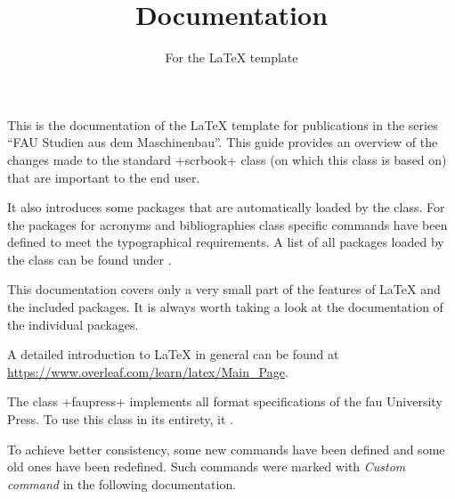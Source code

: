 \documentclass[
  paper = 17x24, %
  language = english, %
  acronym = true, %
  bibliography = true, %
  acronymline = onlyhorizontal, %
]{faupress}
\title{Documentation}
\subtitle{For the LaTeX template}
\institute{University Library of Erlangen-Nürnberg}
\begin{document}
\maketitle %

\frontmatter %
\makefacultytitle %

\begin{preface}

This is the documentation of the \LaTeX{} template for publications in the series
\enquote{FAU Studien aus dem Maschinenbau}. This guide provides an overview of the changes
made to the standard \code+scrbook+ class (on which this class is based on) that are
important to the end user.

It also introduces some packages that are automatically loaded by the class. For the
packages for acronyms and bibliographies class specific commands have been
defined to meet the typographical requirements. A list of all packages loaded by the class
can be found under .

This documentation covers only a very small part of the features of \LaTeX{} and the included
packages. It is always worth taking a look at the documentation of the individual packages.

A detailed introduction to \LaTeX{} in general can be found at \linebreak
\url{https://www.overleaf.com/learn/latex/Main_Page}.

\end{preface}

\tableofcontents\label{toc}
\faupressprintacronyms
\listoffigures\label{lof}
\listoftables\label{lot}

\mainmatter %

\begin{introduction}

The class \code+faupress+ implements all format specifications of the \acs{fau} University
Press. To use this class in its entirety, it .

To achieve better consistency, some new commands have been defined and some old ones have
been redefined. Such commands were marked with \textcolor{documentation}{\itshape Custom command} in the following documentation.

\end{introduction}
\end{document}
